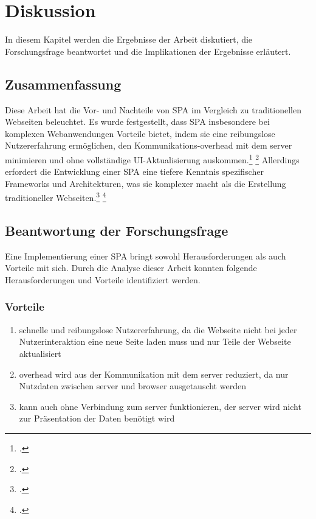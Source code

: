 \section{Diskussion}
In diesem Kapitel werden die Ergebnisse der Arbeit diskutiert, die Forschungsfrage beantwortet und die Implikationen der Ergebnisse erläutert.

\subsection{Zusammenfassung}
Diese Arbeit hat die Vor- und Nachteile von \ac{SPA} im Vergleich zu traditionellen Webseiten beleuchtet.
Es wurde festgestellt, dass \ac{SPA} insbesondere bei komplexen Webanwendungen Vorteile bietet, indem sie eine reibungslose Nutzererfahrung ermöglichen, den Kommunikations-\gls{overhead} mit dem \gls{server} minimieren und ohne vollständige \ac{UI}-Aktualisierung auskommen.\footcite[Vgl.][Seite 5]{Solovei2018} \footcite[Vgl.][Seite 143]{Irudayaraj2019}
Allerdings erfordert die Entwicklung einer \ac{SPA} eine tiefere Kenntnis spezifischer Frameworks und Architekturen, was sie komplexer macht als die Erstellung traditioneller Webseiten.\footcite[Vgl.][Seite 4]{Smith2022} \footcite[Vgl.][Seite 15]{Flanagan2011}


\subsection{Beantwortung der Forschungsfrage}
Eine Implementierung einer \ac{SPA} bringt sowohl Herausforderungen als auch Vorteile mit sich.
Durch die Analyse dieser Arbeit konnten folgende Herausforderungen und Vorteile identifiziert werden.

\subsubsection{Vorteile}
\begin{enumerate}
    \item schnelle und reibungslose Nutzererfahrung, da die Webseite nicht bei jeder Nutzerinteraktion eine neue Seite laden muss und nur Teile der Webseite aktualisiert
    \item \gls{overhead} wird aus der Kommunikation mit dem \gls{server} reduziert, da nur Nutzdaten zwischen \gls{server} und \gls{browser} ausgetauscht werden
    \item kann auch ohne Verbindung zum \gls{server} funktionieren, der \gls{server} wird nicht zur Präsentation der Daten benötigt wird
\end{enumerate}

